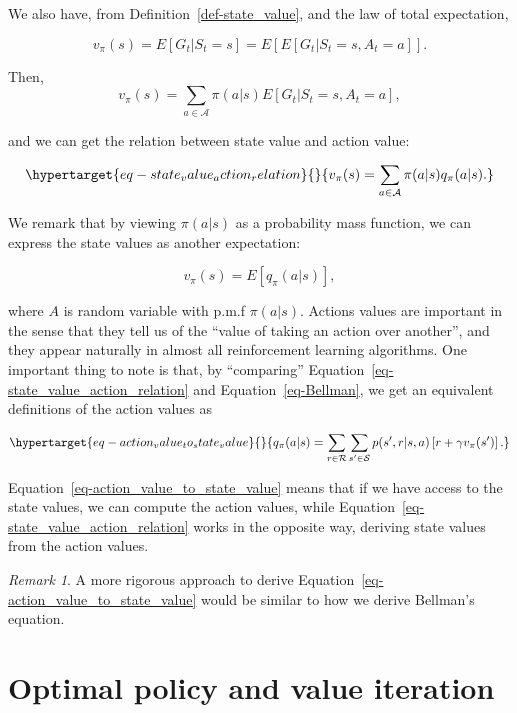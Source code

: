 \documentclass[
  letterpaper,
]{report}
\theoremstyle{plain}
\theoremstyle{definition}
\theoremstyle{definition}
\theoremstyle{remark}
\newtheorem*{remark}{Remark}
\begin{document}
We also have, from Definition~\ref{def-state_value}, and the law of
total expectation,

\[
v_\pi(s) = E[G_t|S_t = s] = E\left[E[G_t|S_t = s, A_t = a]\right].
\]

Then, \[
v_\pi(s) = \sum_{a\in\mathcal{A}}\pi(a|s)E\left[G_t|S_t=s,A_t =a\right],
\]

and we can get the relation between state value and action value:

\begin{equation}\protect\hypertarget{eq-state_value_action_relation}{}{
v_\pi(s) = \sum_{a\in\mathcal{A}} \pi(a|s)q_\pi(a|s).
}\label{eq-state_value_action_relation}\end{equation}

We remark that by viewing \(\pi(a|s)\) as a probability mass function,
we can express the state values as another expectation:

\[
v_\pi(s) = E[q_\pi(a|s)],
\]

where \(A\) is random variable with p.m.f \(\pi(a|s)\). Actions values
are important in the sense that they tell us of the ``value of taking an
action over another'', and they appear naturally in almost all
reinforcement learning algorithms. One important thing to note is that,
by ``comparing'' Equation~\ref{eq-state_value_action_relation} and
Equation~\ref{eq-Bellman}, we get an equivalent definitions of the
action values as

\begin{equation}\protect\hypertarget{eq-action_value_to_state_value}{}{
q_\pi(a|s) = \sum_{r\in\mathcal{R}}\sum_{s'\in\mathcal{S}}p(s',r|s,a)\left[ r + \gamma v_\pi(s')\right].
}\label{eq-action_value_to_state_value}\end{equation}

Equation~\ref{eq-action_value_to_state_value} means that if we have
access to the state values, we can compute the action values, while
Equation~\ref{eq-state_value_action_relation} works in the opposite way,
deriving state values from the action values.

\begin{remark}

A more rigorous approach to derive
Equation~\ref{eq-action_value_to_state_value} would be similar to how we
derive Bellman's equation.

\end{remark}

\hypertarget{optimal-policy-and-value-iteration}{%
\section{Optimal policy and value
iteration}\label{optimal-policy-and-value-iteration}}
\end{document}
